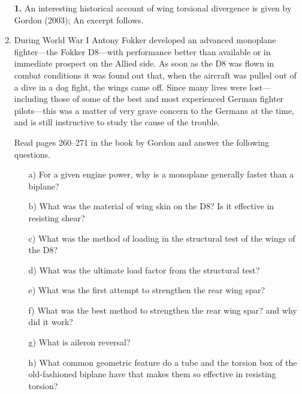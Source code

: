 \documentclass{AeroStructure-ERJohnson}
\makeatletter
\newenvironment{splquote}%
               {\list{}{\leftmargin18pt\listparindent\parindent\topsep-3\p@}%
                \normalsize\itemindent-5\p@\listparindent\parindent%
                \item\relax}%
               {\endlist}%
\makeatother
\begin{document}
\begin{exercise}
\begin{enumerate}[\textbf{2.}]
\item[\textbf{1.}] An interesting historical account of wing torsional divergence is given by Gordon (2003); An excerpt follows.\vspace*{6pt}
\begin{splquote}
\hspace*{10pt}During World War I Antony Fokker developed an advanced monoplane fighter---the Fokker D8---with performance better than available or in immediate prospect on the Allied side. As soon as the D8 was flown in combat conditions it was found out that, when the aircraft was pulled out of a dive in a dog fight, the wings came off. Since many lives were lost---including those of some of the best and most experienced German fighter pilots---this was a matter of very grave concern to the Germans at the time, and is still instructive to study the cause of the trouble.\vspace*{1.6pt}
\end{splquote}

\bigskip

\hspace*{3pt}Read pages 260--271 in the book by Gordon and answer the following questions.
\begin{enumerate}[b)]
  \item[{\hskip13pt}a)] For a given engine power, why is a monoplane generally faster than a biplane?
  \item[{\hskip13pt}b)] What was the material of wing skin on the D8? Is it effective in resisting shear?
  \item[{\hskip13pt}c)] What was the method of loading in the structural test of the wings of the D8?
  \item[{\hskip13pt}d)] What was the ultimate load factor from the structural test?
  \item[{\hskip13pt}e)] What was the first attempt to strengthen the rear wing spar\vadjust{\vspace*{8pt}\pagebreak}?
  \item[{\hskip13pt}f)] What was the best method to strengthen the rear wing spar? and why did it work?
  \item[{\hskip13pt}g)] What is aileron reversal?
  \item[{\hskip13pt}h)] What common geometric feature do a tube and the torsion box of the old-fashioned biplane have that makes them so effective in resisting torsion?
\end{enumerate}




\end{enumerate}
\end{exercise}
\end{document}
